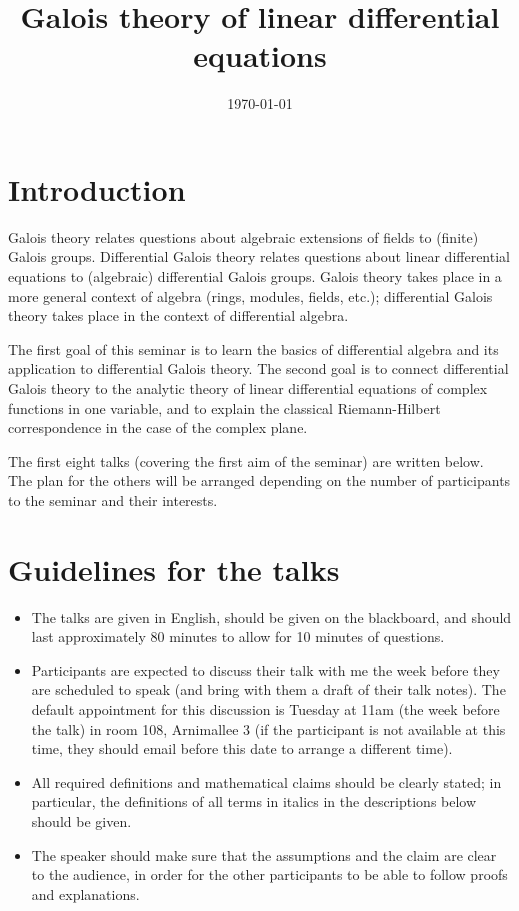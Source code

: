 \documentclass{amsart}
\date{\today}
\title{Galois theory of linear differential equations}
\theoremstyle{definition}
\theoremstyle{remark}
\begin{document}
\maketitle

\section*{Introduction}

Galois theory relates questions about algebraic extensions of fields to (finite) Galois groups. Differential Galois theory relates questions about linear differential equations to (algebraic) differential Galois groups. Galois theory takes place in a more general context of algebra (rings, modules, fields, etc.); differential Galois theory takes place in the context of differential algebra. 

The first goal of this seminar is to learn the basics of differential algebra and its application to differential Galois theory. The second goal is to connect differential Galois theory to the analytic theory of linear differential equations of complex functions in one variable, and to explain the classical Riemann-Hilbert correspondence in the case of the complex plane. 

The first eight talks (covering the first aim of the seminar) are written below. The plan for the others will be arranged depending on the number of participants to the seminar and their interests.

\section*{Guidelines for the talks}

\begin{itemize}
\item The talks are given in English, should be given on the blackboard, and should last approximately 80 minutes to
allow for 10 minutes of questions.
\item Participants are expected to discuss their talk with me the week before they are scheduled to
speak (and bring with them a draft of their talk notes). The default appointment for this
discussion is Tuesday at 11am (the week before the talk) in room 108, Arnimallee 3 (if the participant
is not available at this time, they should email before this date to arrange a different time).
\item All required definitions and mathematical claims should be clearly stated; in particular, the
  definitions of all terms in italics in the descriptions below should be given.
\item The speaker should make sure that the assumptions and the claim are clear to the audience, in order for the
other participants to be able to follow proofs and explanations.
\end{itemize}
\end{document}

